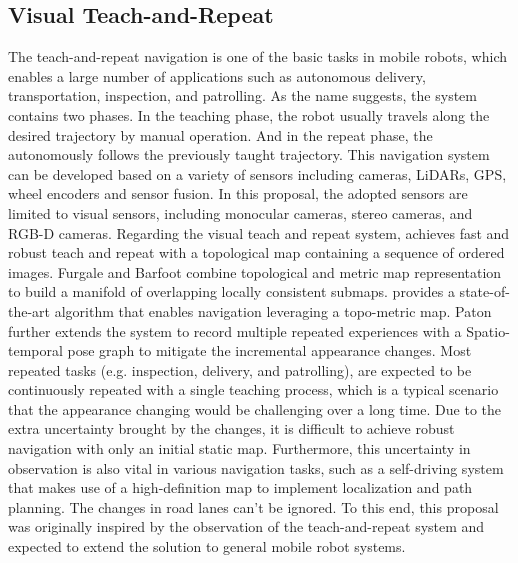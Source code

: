 \subsection{Visual Teach-and-Repeat}
The teach-and-repeat navigation\cite{paul2010vtr,mcmanus2012visual} is one of the basic tasks in mobile robots, which enables a large number of applications such as autonomous delivery, transportation, inspection, and patrolling. As the name suggests, the system contains two phases. In the teaching phase, the robot usually travels along the desired trajectory by manual operation. And in the repeat phase, the autonomously follows the previously taught trajectory. This navigation system can be developed based on a variety of sensors including cameras\cite{paul2010vtr,mcmanus2012visual,dall2021fast}, LiDARs\cite{sprunk2013lidar}, GPS\cite{li1998robot}, wheel encoders\cite{krajnik2018navigation} and sensor fusion\cite{nitsche2020visual}. In this proposal, the adopted sensors are limited to visual sensors, including monocular cameras, stereo cameras, and RGB-D cameras. Regarding the visual teach and repeat system, \cite{dall2021fast} achieves fast and robust teach and repeat with a topological map containing a sequence of ordered images. Furgale and Barfoot\cite{paul2010vtr} combine topological and metric map representation to build a manifold of overlapping locally consistent submaps. 
provides a state-of-the-art algorithm that enables navigation leveraging a topo-metric map. Paton\cite{paton2016bridging} further extends the system to record multiple repeated experiences with a Spatio-temporal pose graph to mitigate the incremental appearance changes. Most repeated tasks (e.g. inspection, delivery, and patrolling), are expected to be continuously repeated with a single teaching process, which is a typical scenario that the appearance changing would be challenging over a long time\cite{qian2022pocd}. Due to the extra uncertainty brought by the changes, it is difficult to achieve robust navigation with only an initial static map. Furthermore, this uncertainty in observation is also vital in various navigation tasks, such as a self-driving system that makes use of a high-definition map to implement localization and path planning. The changes in road lanes can't be ignored. To this end, this proposal was originally inspired by the observation of the teach-and-repeat system and expected to extend the solution to general mobile robot systems. 
